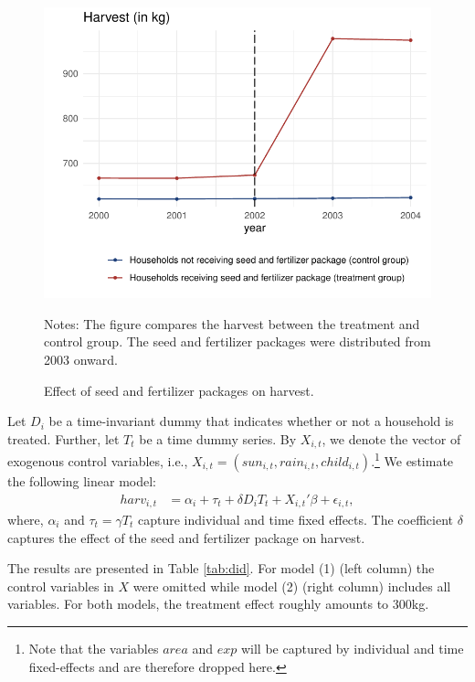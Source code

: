 \begin{figure}[htb]
	\begin{center}
		\includegraphics[width=0.55\linewidth]{../figures/part5a.pdf}
	\end{center}
	\caption{Effect of seed and fertilizer packages on harvest.}
	\label{fig:did_a}	{\footnotesize Notes: The figure compares the harvest between the treatment and control group. The seed and fertilizer packages were distributed from 2003 onward.}
\end{figure}


Let $D_i$ be a time-invariant dummy that indicates whether or not a household is treated. Further, let $T_t$ be a time dummy series. By $X_{i,t}$, we denote the vector of exogenous control variables, i.e., $X_{i,t} = \left(sun_{i,t}, rain_{i,t}, child_{i,t}\right)$.\footnote{Note that the variables $area$ and $exp$ will be captured by individual and time fixed-effects and are therefore dropped here.}
We estimate the following linear model:
\begin{align}
	\label{eq:eq7did}
	harv_{i,t} &= \alpha_i + \tau_t + \delta D_{i} T_t + X_{i,t}'\beta + \epsilon_{i,t},
\end{align}
where, $\alpha_i$ and $\tau_t = \gamma T_t$ capture individual and time fixed effects. The coefficient $\delta$ captures the effect of the seed and fertilizer package on harvest. 

The results are presented in Table \ref{tab:did}. For model (1) (left column) the control variables in $X$ were omitted while model (2) (right column) includes all variables. For both models, the treatment effect roughly amounts to 300kg.

